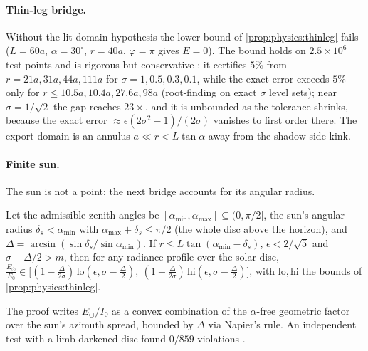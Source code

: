 \paragraph{Thin-leg bridge.} Without the lit-domain hypothesis the lower bound of
\cref{prop:physics:thinleg} fails ($L=60a$, $\alpha=30^\circ$, $r=40a$,
$\varphi=\pi$ gives $E=0$). The bound holds on $2.5\times10^6$ test points and is rigorous but
conservative : it certifies $5\%$ from $r=21a,31a,44a,111a$ for
$\sigma=1,0.5,0.3,0.1$, while the exact error exceeds $5\%$ only for $r\le10.5a,10.4a,27.6a,98a$ (root-finding on exact $\sigma$ level sets);
near $\sigma=1/\sqrt2$ the gap reaches $23\times$, and it is unbounded as the tolerance
shrinks, because the exact error $\approx\epsilon(2\sigma^2-1)/(2\sigma)$ vanishes to first order
there. The export domain is an annulus $a\ll r<L\tan\alpha$ away from the shadow-side kink.

\paragraph{Finite sun.} The sun is not a point; the next bridge accounts for its angular
radius.

\begin{proposition}\label{prop:physics:finitesun}
Let the admissible zenith angles be $[\alpha_{\min},\alpha_{\max}]\subseteq(0,\pi/2]$, the sun's
angular radius $\delta_s<\alpha_{\min}$ with $\alpha_{\max}+\delta_s\le\pi/2$ (the whole disc above the horizon), and $\Delta=\arcsin(\sin\delta_s/\sin\alpha_{\min})$.
If $r\le L\tan(\alpha_{\min}-\delta_s)$, $\epsilon<2/\sqrt5$ and $\sigma-\Delta/2>m$, then for
any radiance profile over the solar disc,
$\frac{E_\odot}{E_0}\in\big[(1-\frac\Delta{2\sigma})\,\mathrm{lo}(\epsilon,\sigma-\frac\Delta2),\ (1+\frac\Delta{2\sigma})\,\mathrm{hi}(\epsilon,\sigma-\frac\Delta2)\big]$,
with $\mathrm{lo},\mathrm{hi}$ the bounds of \cref{prop:physics:thinleg}.
\end{proposition}

The proof writes $E_\odot/I_0$ as a convex combination of the $\alpha$-free geometric factor over
the sun's azimuth spread, bounded by $\Delta$ via Napier's rule. An independent test with a
limb-darkened disc found $0/859$ violations .

